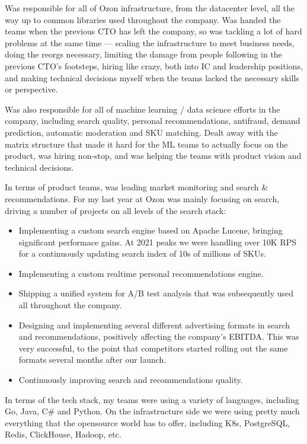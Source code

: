 \documentclass[margin,line]{CV}
\begin{document}
\begin{resume}
    Was responsible for all of Ozon infrastructure, from the datacenter level, all the way up to common libraries used throughout the company. Was handed the teams when the previous CTO has left the company, so was tackling a lot of hard problems at the same time --- scaling the infrastructure to meet business needs, doing the reorgs necessary, limiting the damage from people following in the previous CTO's footsteps, hiring like crazy, both into IC and leadership positions, and making technical decisions myself when the teams lacked the necessary skills or perspective.

    Was also responsible for all of machine learning / data science efforts in the company, including search quality, personal recommendations, antifraud, demand prediction, automatic moderation and SKU matching.  Dealt away with the matrix structure that made it hard for the ML teams to actually focus on the product, was hiring non-stop, and was helping the teams with product vision and technical decisions.

    In terms of product teams, was leading market monitoring and search \& recommendations. For my last year at Ozon was mainly focusing on search, driving a number of projects on all levels of the search stack:
    \begin{itemize}
    \item Implementing a custom search engine based on Apache Lucene, bringing significant performace gains. At 2021 peaks we were handling over 10K RPS for a continuously updating search index of 10s of millions of SKUs.
    \item Implementing a custom realtime personal recommendations engine.
    \item Shipping a unified system for A/B test analysis that was subsequently used all throughout the company.
    \item Designing and implementing several different advertising formats in search and recommendations, positively affecting the company's EBITDA. This was very successful, to the point that competitors started rolling out the same formats several months after our launch.
    \item Continuously improving search and recommendations quality.
    \end{itemize}
    
    In terms of the tech stack, my teams were using a variety of languages, including Go, Java, C\# and Python. On the infrastructure side we were using pretty much everything that the opensource world has to offer, including K8s, PostgreSQL, Redis, ClickHouse, Hadoop, etc.


\end{resume}
\end{document}
